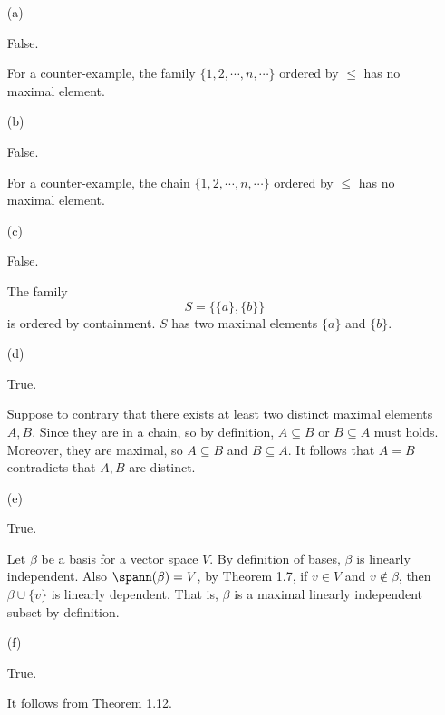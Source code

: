 \begin{Exercise}
	\begin{enumerate}[(a)]
		\item[(a)]
		\begin{answer}
			False.
		\end{answer}
		\begin{solution}
			For a counter-example, the family $\{1,2,\cdots,n,\cdots\}$ ordered by $\leq$ has no maximal element.
		\end{solution}
		
		\item[(b)]
		\begin{answer}
			False.
		\end{answer}
		\begin{solution}
			For a counter-example, the chain $\{1,2,\cdots,n,\cdots\}$ ordered by $\leq$ has no maximal element.
		\end{solution}
		
		\item[(c)]
		\begin{answer}
			False.
		\end{answer}
		\begin{solution}
			The family
			$$
			S = \{ \{a\}, \{b\} \}
			$$
			is ordered by containment. $S$ has two maximal elements $\{a\}$ and $\{b\}$.
		\end{solution}
		
		\item[(d)]
		\begin{answer}
			True.
		\end{answer}
		\begin{solution}
			Suppose to contrary that there exists at least two distinct maximal elements $A,B$. Since they are in a chain, so by definition, $A\subseteq B$ or $B\subseteq A$ must holds. Moreover, they are maximal, so $A\subseteq B$ and $B\subseteq A$. It follows that $A=B$ contradicts that $A,B$ are distinct.
		\end{solution}
		
		\item[(e)]
		\begin{answer}
			True.
		\end{answer}
		\begin{solution}
			Let $\beta$ be a basis for a vector space $V$. By definition of bases, $\beta$ is linearly independent. Also $\spann(\beta)=V$, by Theorem 1.7, if $v\in V$ and $v\notin \beta$, then $\beta\cup\{v\}$ is linearly dependent. That is, $\beta$ is a maximal linearly independent subset by definition.
		\end{solution}
		
		\item[(f)]
		\begin{answer}
			True.
		\end{answer}
		\begin{solution}
			It follows from Theorem 1.12.
		\end{solution}
		
	\end{enumerate}
\end{Exercise}